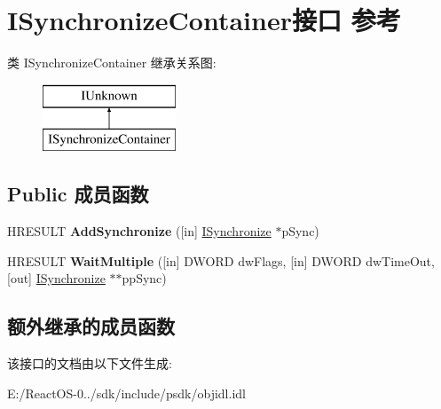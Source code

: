 \hypertarget{interface_i_synchronize_container}{}\section{I\+Synchronize\+Container接口 参考}
\label{interface_i_synchronize_container}
类 I\+Synchronize\+Container 继承关系图\+:\begin{figure}[H]
\begin{center}
\leavevmode
\includegraphics[height=2.000000cm]{interface_i_synchronize_container}
\end{center}
\end{figure}
\subsection*{Public 成员函数}
\begin{DoxyCompactItemize}
\item 
\mbox{\label{interface_i_synchronize_container_a635d06ee7e666a45ab3d73f9f473a3cd}} 
H\+R\+E\+S\+U\+LT {\bfseries Add\+Synchronize} (\mbox{[}in\mbox{]} \hyperlink{interface_i_synchronize}{I\+Synchronize} $\ast$p\+Sync)
\item 
\mbox{\label{interface_i_synchronize_container_a32da667ee8da4002b409715f666ea380}} 
H\+R\+E\+S\+U\+LT {\bfseries Wait\+Multiple} (\mbox{[}in\mbox{]} D\+W\+O\+RD dw\+Flags, \mbox{[}in\mbox{]} D\+W\+O\+RD dw\+Time\+Out, \mbox{[}out\mbox{]} \hyperlink{interface_i_synchronize}{I\+Synchronize} $\ast$$\ast$pp\+Sync)
\end{DoxyCompactItemize}
\subsection*{额外继承的成员函数}


该接口的文档由以下文件生成\+:\begin{DoxyCompactItemize}
\item 
E\+:/\+React\+O\+S-\/0../sdk/include/psdk/objidl.\+idl\end{DoxyCompactItemize}
